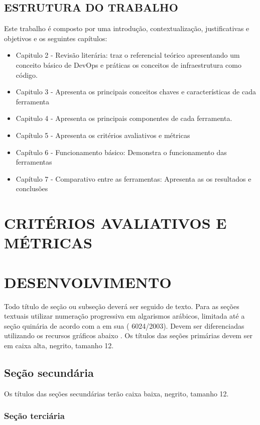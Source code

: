 \section{\esp ESTRUTURA DO TRABALHO}
Este trabalho é composto por uma introdução, contextualização, justificativas e objetivos e os seguintes capítulos:
\begin{itemize}
\item Capitulo 2 - Revisão literária: traz  o referencial teórico apresentando um conceito básico de DevOps e práticas os conceitos de infraestrutura como código.  
\item Capitulo 3 - Apresenta os principais conceitos chaves e características de cada ferramenta
\item Capitulo 4 - Apresenta os principais componentes de cada ferramenta.
\item Capítulo 5 - Apresenta os critérios avaliativos e  métricas
\item Capítulo 6 - Funcionamento básico: Demonstra o funcionamento das ferramentas 
\item Capítulo 7 - Comparativo entre as ferramentas: Apresenta as os resultados e conclusões
\end{itemize}

\chapter{CRITÉRIOS AVALIATIVOS E MÉTRICAS}
\chapter{DESENVOLVIMENTO}

Todo título de seção ou subseção deverá ser seguido de texto.
Para as seções textuais utilizar numeração progressiva em algarismos arábicos, limitada até a seção quinária de acordo com 
a  em sua ( 6024/2003). Devem ser diferenciadas utilizando os recursos gráficos abaixo \cite{manualpuc}.
Os títulos das seções primárias devem ser em caixa alta, negrito, tamanho 12.

\section{\esp Seção secundária}

Os títulos das seções secundárias terão caixa baixa, negrito, tamanho 12.

\subsection{\esp Seção terciária}


